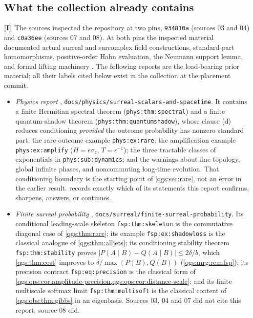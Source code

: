 \documentclass[11pt,oneside]{article}
\numberwithin{equation}{section}
\theoremstyle{plain}
\theoremstyle{definition}
\theoremstyle{remark}
\newcommand{\abs}[1]{\left|#1\right|}
\newcommand{\TI}{\textcolor{TierI}{\textsf{\bfseries[I]}}}
\begin{document}
\subsection{What the collection already contains}\label{qgs:sec:collection}
\TI\ The sources inspected the repository at two pins, \texttt{934810a} (sources 03 and 04) and \texttt{c0a36ee} (sources 07 and 08). At both pins the inspected material documented actual surreal and surcomplex field constructions, standard-part homomorphisms, positive-order Hahn evaluation, the Neumann support lemma, and formal lifting machinery \cite{repo}. The following reports are the load-bearing prior material; all their labels cited below exist in the collection at the placement commit.

\begin{itemize}
\item \emph{Physics report} \cite{repoPhysics}, \texttt{docs/physics/surreal-scalars-and-spacetime}. It contains a finite Hermitian spectral theorem (\texttt{phys:thm:spectral}) and a finite quantum-shadow theorem (\texttt{phys:thm:quantumshadow}), whose clause (d) reduces conditioning \emph{provided} the outcome probability has nonzero standard part; the rare-outcome example \texttt{phys:ex:rare}; the amplification example \texttt{phys:ex:amplify} ($H=\epsilon\sigma_z$, $T=\epsilon^{-1}$); the three tractable classes of exponentials in \texttt{phys:sub:dynamics}; and the warnings about fine topology, global infinite phases, and noncommuting long-time evolution. That conditioning boundary is the starting point of \cref{qgs:sec:rare}, not an error in the earlier result.  records exactly which of its statements this report confirms, sharpens, answers, or continues.
\item \emph{Finite surreal probability} \cite{repoProbability}, \texttt{docs/surreal/finite-surreal-probability}. Its conditional leading-scale skeleton \texttt{fsp:thm:skeleton} is the commutative diagonal case of \cref{qgs:thm:rare}; its example \texttt{fsp:ex:shadowloss} is the classical analogue of \cref{qgs:thm:alljets}; its conditioning stability theorem \texttt{fsp:thm:stability} proves $\abs{P(A\mid B)-Q(A\mid B)}\le2\delta/b$, which \cref{qgs:thm:cost} improves to $\delta/\max(P(B),Q(B))$ (\cref{qgs:mrg:rem:fsp}); its precision contract \texttt{fsp:eq:precision} is the classical form of \cref{qgs:ops:cor:amplitude-precision,qgs:ops:cor:distance-scale}; and its finite multiscale softmax limit \texttt{fsp:thm:multisoft} is the classical content of \cref{qgs:obs:thm:gibbs} in an eigenbasis. Sources 03, 04 and 07 did not cite this report; source 08 did.

\end{itemize}
\end{document}
